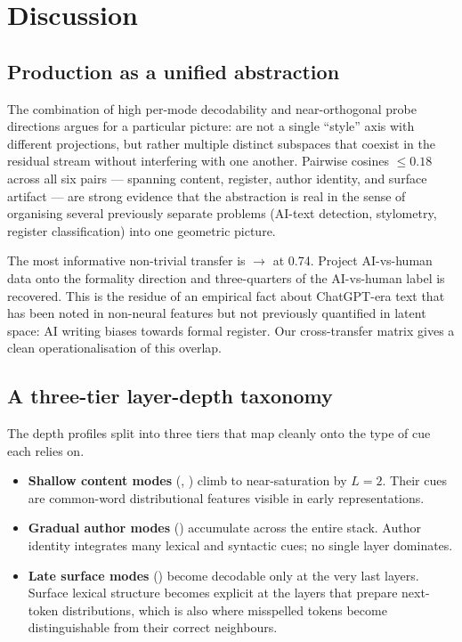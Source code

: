 \section{Discussion}
\label{sec:discussion}

\subsection{Production \modes as a unified abstraction}

The combination of high per-mode decodability and near-orthogonal probe directions argues for a particular picture: \modes are not a single ``style'' axis with different projections, but rather multiple distinct subspaces that coexist in the residual stream without interfering with one another. Pairwise cosines $\leq 0.18$ across all six pairs --- spanning content, register, author identity, and surface artifact --- are strong evidence that the \modes abstraction is real in the sense of organising several previously separate problems (AI-text detection, stylometry, register classification) into one geometric picture.

The most informative non-trivial transfer is \register $\to$ \aihuman at 0.74. Project AI-vs-human data onto the formality direction and three-quarters of the AI-vs-human label is recovered. This is the residue of an empirical fact about ChatGPT-era text that has been noted in non-neural features \citep{schafer2025stylistic} but not previously quantified in latent space: AI writing biases towards formal register. Our cross-transfer matrix gives a clean operationalisation of this overlap.

\subsection{A three-tier layer-depth taxonomy}

The depth profiles split into three tiers that map cleanly onto the type of cue each \modes relies on.

\begin{itemize}[leftmargin=*,itemsep=0pt,topsep=0pt]
\item \textbf{Shallow content modes} (\aihuman, \register) climb to near-saturation by $L=2$. Their cues are common-word distributional features visible in early representations.
\item \textbf{Gradual author modes} (\authorship) accumulate across the entire stack. Author identity integrates many lexical and syntactic cues; no single layer dominates.
\item \textbf{Late surface modes} (\typo) become decodable only at the very last layers. Surface lexical structure becomes explicit at the layers that prepare next-token distributions, which is also where misspelled tokens become distinguishable from their correct neighbours.
\end{itemize}

